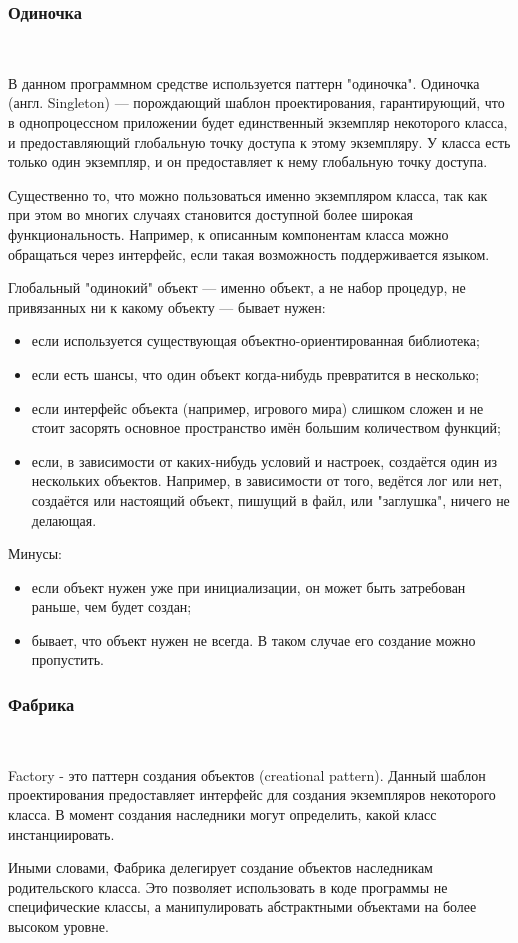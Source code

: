 \subsubsection{Одиночка}
\

В данном программном средстве используется паттерн "одиночка".
Одиночка (англ. Singleton) — порождающий шаблон проектирования, гарантирующий, что в однопроцессном приложении будет единственный экземпляр некоторого класса, и предоставляющий глобальную точку доступа к этому экземпляру. У класса есть только один экземпляр, и он предоставляет к нему глобальную точку доступа. 

Существенно то, что можно пользоваться именно экземпляром класса, так как при этом во многих случаях становится доступной более широкая функциональность. Например, к описанным компонентам класса можно обращаться через интерфейс, если такая возможность поддерживается языком.

Глобальный "одинокий" объект — именно объект, а не набор процедур, не привязанных ни к какому объекту — бывает нужен:

\begin{itemize}
    \item если используется существующая объектно-ориентированная библиотека;
    \item если есть шансы, что один объект когда-нибудь превратится в несколько;
    \item если интерфейс объекта (например, игрового мира) слишком сложен и не стоит засорять основное пространство имён большим количеством функций;
    \item если, в зависимости от каких-нибудь условий и настроек, создаётся один из нескольких объектов. Например, в зависимости от того, ведётся лог или нет, создаётся или настоящий объект, пишущий в файл, или "заглушка", ничего не делающая.
\end{itemize}

Минусы:
\begin{itemize}
    \item если объект нужен уже при инициализации, он может быть затребован раньше, чем будет создан;
    \item бывает, что объект нужен не всегда. В таком случае его создание можно пропустить.
\end{itemize}

\subsubsection{Фабрика}
\

Factory - это паттерн создания объектов (creational pattern). Данный шаблон проектирования предоставляет интерфейс для создания экземпляров некоторого класса. В момент создания наследники могут определить, какой класс инстанциировать.

Иными словами, Фабрика делегирует создание объектов наследникам родительского класса. Это позволяет использовать в коде программы не специфические классы, а манипулировать абстрактными объектами на более высоком уровне.